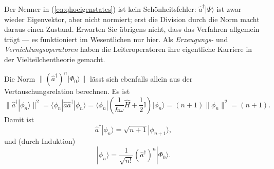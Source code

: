 Der Nenner in (\ref{eq:qhoeigenstates}) ist kein Schönheitsfehler: $\widehat{a}^\dag|\Psi\rangle$ ist zwar wieder Eigenvektor, aber nicht normiert; erst die Division durch die Norm macht daraus einen Zustand. Erwarten Sie übrigens nicht, dass das Verfahren allgemein trägt --- es funktioniert im Wesentlichen nur hier. Als \emph{Erzeugungs-} und \emph{Vernichtungsoperatoren} haben die Leiteroperatoren ihre eigentliche Karriere in der Vielteilchentheorie gemacht.

Die Norm $\|(\widehat{a}^\dag)^n|\Phi_0\rangle\|$ lässt sich ebenfalls allein aus der Vertauschungsrelation
berechnen. Es ist
\begin{equation}
	\|\widehat{a}^\dag|\phi_n\rangle\|^2 = \langle\phi_n|\widehat{a}\widehat{a}^\dag|\phi_n\rangle =  \langle\phi_n|\left(\frac{1}{\hbar\omega}\widehat{H}+\frac12\mathbb{I}\right)|\phi_n\rangle=(n+1)\|\phi_n\|^2 = (n+1).
\end{equation}
Damit ist 
\begin{equation}
	\widehat{a}^\dag|\phi_n\rangle = \sqrt{n+1}|\phi_{n+1}\rangle,
\end{equation}
und (durch Induktion)
\begin{equation}
	|\phi_n\rangle = \frac{1}{\sqrt{n!}}(\widehat{a}^\dag)^n|\Phi_0\rangle.
\end{equation}

